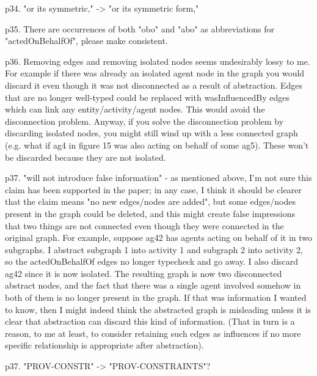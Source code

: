 \documentclass{article}
\newcommand{\showComments}{yes} %
\newcommand{\com}[2]{\ifthenelse{\equal{\showComments}{yes}}{\textcolor{#1}{#2}}{}}
\newcommand{\comment}[1]{\com{red}{#1}}
\begin{document}
\comment{must make this assumption clear}

p34. "or its symmetric," -> "or its symmetric form,"

p35.  There are occurrences of both "obo" and "abo" as abbreviations for "actedOnBehalfOf", please make consistent.



p36.  Removing edges and removing isolated nodes seems undesirably lossy to me.   For example if there was already an isolated agent node in the graph you would discard it even though it was not disconnected as a result of abstraction.
\comment{good point}
Edges that are no longer well-typed could be replaced with wasInfluencedBy edges which can link any entity/activity/agent nodes.  This would avoid the disconnection problem.
Anyway, if you solve the disconnection problem by discarding isolated nodes, you might still wind up with a less connected graph (e.g. what if ag4 in figure 15 was also acting on behalf of some ag5). These won't be discarded because they are not isolated.
\comment{not sure how to solve this one}

p37. "will not introduce false information" - as mentioned above, I'm not sure this claim has been supported in the paper; in any case, I think it should be clearer that the claim means "no new edges/nodes are added", but some edges/nodes present in the graph could be deleted, and this might create false impressions that two things are not connected even though they were connected in the original graph.  For example, suppose ag42 has agents acting on behalf of it in two subgraphs.  I abstract subgraph 1 into activity 1 and subgraph 2 into activity 2, so the actedOnBehalfOf edges no longer typecheck and go away.  I also discard ag42 since it is now isolated.  The resulting graph is now two disconnected abstract nodes, and the fact that there was a single agent involved somehow in both of them is no longer present in the graph.  If that was information I wanted to know, then I might indeed think the abstracted graph is misleading unless it is clear that abstraction can discard this kind of information.  (That in turn is a reason, to me at least, to consider retaining such edges as influences if no more specific relationship is appropriate after abstraction).

\comment{Is the assumption we actually work with that agents are on the ``outside'' of the graph? We should make this clear if so.}

p37. "PROV-CONSTR" -> "PROV-CONSTRAINTS"?
\end{document}
